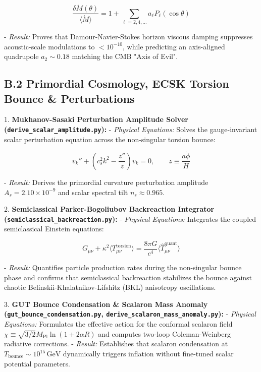 \documentclass[11pt,a4paper]{article}
\theoremstyle{definition}\newtheorem{definition}{Definition}
\theoremstyle{remark}\newtheorem{remark}{Remark}
\begin{document}
\begin{equation}
\frac{\delta\dot{M}(\theta)}{\langle\dot{M}\rangle} = 1 + \sum_{\ell=2, 4, \dots} a_\ell P_\ell(\cos\theta)
\end{equation}


- \textit{Result:} Proves that Damour-Navier-Stokes horizon viscous damping suppresses acoustic-scale modulations to $< 10^{-10}$, while predicting an axis-aligned quadrupole $a_2 \sim 0.18$ matching the CMB "Axis of Evil".
\subsection{B.2 Primordial Cosmology, ECSK Torsion Bounce \& Perturbations}

1. \textbf{Mukhanov-Sasaki Perturbation Amplitude Solver (\texttt{derive_scalar_amplitude.py}):}
- \textit{Physical Equations:} Solves the gauge-invariant scalar perturbation equation across the non-singular torsion bounce:


\begin{equation}
v_k'' + \left( c_s^2 k^2 - \frac{z''}{z} \right) v_k = 0, \qquad z \equiv \frac{a \dot{\phi}}{H}
\end{equation}


- \textit{Result:} Derives the primordial curvature perturbation amplitude $A_s = 2.10 \times 10^{-9}$ and scalar spectral tilt $n_s \approx 0.965$.

2. \textbf{Semiclassical Parker-Bogoliubov Backreaction Integrator (\texttt{semiclassical_backreaction.py}):}
- \textit{Physical Equations:} Integrates the coupled semiclassical Einstein equations:


\begin{equation}
G_{\mu\nu} + \kappa^2 \langle T_{\mu\nu}^{\text{torsion}} \rangle = \frac{8\pi G}{c^4} \langle \hat{T}_{\mu\nu}^{\text{quant}} \rangle
\end{equation}


- \textit{Result:} Quantifies particle production rates during the non-singular bounce phase and confirms that semiclassical backreaction stabilizes the bounce against chaotic Belinskii-Khalatnikov-Lifshitz (BKL) anisotropy oscillations.

3. \textbf{GUT Bounce Condensation \& Scalaron Mass Anomaly (\texttt{gut_bounce_condensation.py}, \texttt{derive_scalaron_mass_anomaly.py}):}
- \textit{Physical Equations:} Formulates the effective action for the conformal scalaron field $\chi \equiv \sqrt{3/2} M_{\text{Pl}} \ln(1 + 2\alpha R)$ and computes two-loop Coleman-Weinberg radiative corrections.
- \textit{Result:} Establishes that scalaron condensation at $T_{\text{bounce}} \sim 10^{15} \, \mathrm{GeV}$ dynamically triggers inflation without fine-tuned scalar potential parameters.
\end{document}
